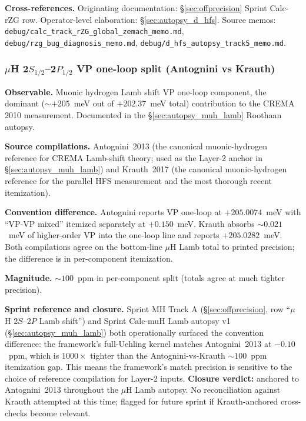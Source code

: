 \documentclass[11pt]{article}
\begin{document}
\textbf{Cross-references.}  Originating documentation:
\S\ref{sec:offprecision} Sprint Calc-rZG row.  Operator-level
elaboration: \S\ref{sec:autopsy_d_hfs}.  Source memos:
\texttt{debug/calc\_track\_rZG\_global\_zemach\_memo.md},
\texttt{debug/rzg\_bug\_diagnosis\_memo.md},
\texttt{debug/d\_hfs\_autopsy\_track5\_memo.md}.

\subsubsection{$\mu$H 2$S_{1/2}$--2$P_{1/2}$ VP one-loop split (Antognini vs Krauth)}
\label{sec:conv_muH_VP}

\textbf{Observable.}  Muonic hydrogen Lamb shift VP one-loop
component, the dominant ($\sim +205$~meV out of $+202.37$~meV total)
contribution to the CREMA 2010 measurement.  Documented in the
\S\ref{sec:autopsy_muh_lamb} Roothaan autopsy.

\textbf{Source compilations.}  Antognini~2013 (the canonical
muonic-hydrogen reference for CREMA Lamb-shift theory; used as the
Layer-2 anchor in \S\ref{sec:autopsy_muh_lamb}) and Krauth~2017 (the
canonical muonic-hydrogen reference for the parallel HFS measurement
and the most thorough recent itemization).

\textbf{Convention difference.}  Antognini reports VP one-loop at
$+205.0074$~meV with ``VP-VP mixed'' itemized separately at
$+0.150$~meV.  Krauth absorbs $\sim 0.021$~meV of higher-order VP
into the one-loop line and reports $+205.0282$~meV.  Both compilations
agree on the bottom-line $\mu$H Lamb total to printed precision; the
difference is in per-component itemization.

\textbf{Magnitude.}  $\sim 100$~ppm in per-component split (totals
agree at much tighter precision).

\textbf{Sprint reference and closure.}  Sprint MH Track A
(\S\ref{sec:offprecision}, row ``$\mu$H 2$S$--2$P$ Lamb shift'') and
Sprint Calc-muH Lamb autopsy v1 (\S\ref{sec:autopsy_muh_lamb}) both
operationally surfaced the convention difference: the framework's
full-Uehling kernel matches Antognini~2013 at $-0.10$~ppm, which is
$1000\times$ tighter than the Antognini-vs-Krauth $\sim 100$~ppm
itemization gap.  This means the framework's match precision is
sensitive to the choice of reference compilation for Layer-2 inputs.
\textbf{Closure verdict:} anchored to Antognini~2013 throughout the
$\mu$H Lamb autopsy.  No reconciliation against Krauth attempted at
this time; flagged for future sprint if Krauth-anchored cross-checks
become relevant.
\end{document}
